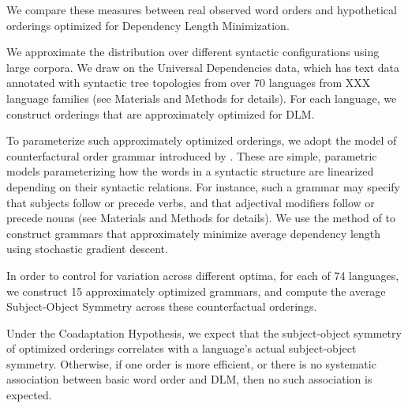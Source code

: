 \documentclass[11pt,a4paper]{article}
\newcommand\comment[1]{{\color{red}#1}}
\begin{document}
We compare these measures between real observed word orders and hypothetical orderings optimized for Dependency Length Minimization.

We approximate the distribution over different syntactic configurations using large corpora.
We draw on the Universal Dependencies data, which has text data annotated with syntactic tree topologies from over 70 languages from XXX language families (see Materials and Methods for details).
For each language, we construct orderings that are approximately optimized for DLM.

To parameterize such approximately optimized orderings, we adopt the model of counterfactural order grammar introduced by \citet{gildea-optimizing-2007}.
These are simple, parametric models parameterizing how the words in a syntactic structure are linearized depending on their syntactic relations.
For instance, such a grammar may specify that subjects follow or precede verbs, and that adjectival modifiers follow or precede nouns (see Materials and Methods for details).
We use the method of \citet{hahn2020universals} to construct grammars that approximately minimize average dependency length using stochastic gradient descent.

In order to control for variation across different optima, for each of 74 languages, we construct 15 approximately optimized grammars, and compute the average Subject-Object Symmetry across these counterfactual orderings.



Under the Coadaptation Hypothesis, we expect that the subject-object symmetry of optimized orderings correlates with a language's actual subject-object symmetry.
Otherwise, if one order is more efficient, or there is no systematic association between basic word order and DLM, then no such association is expected.
\end{document}
